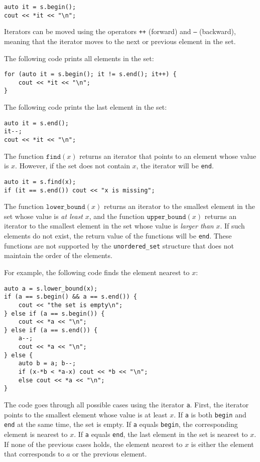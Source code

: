 \begin{lstlisting}
auto it = s.begin();
cout << *it << "\n";
\end{lstlisting}

Iterators can be moved using the operators
\texttt{++} (forward) and \texttt{---} (backward),
meaning that the iterator moves to the next
or previous element in the set.

The following code prints all elements in the set:
\begin{lstlisting}
for (auto it = s.begin(); it != s.end(); it++) {
    cout << *it << "\n";
}
\end{lstlisting}
The following code prints the last element in the set:
\begin{lstlisting}
auto it = s.end();
it--;
cout << *it << "\n";
\end{lstlisting}

The function $\texttt{find}(x)$ returns an iterator
that points to an element whose value is $x$.
However, if the set does not contain $x$,
the iterator will be \texttt{end}.

\begin{lstlisting}
auto it = s.find(x);
if (it == s.end()) cout << "x is missing";
\end{lstlisting}

The function $\texttt{lower\_bound}(x)$ returns
an iterator to the smallest element in the set
whose value is \emph{at least} $x$, and
the function $\texttt{upper\_bound}(x)$
returns an iterator to the smallest element
in the set whose value is \emph{larger than} $x$.
If such elements do not exist,
the return value of the functions will be \texttt{end}.
These functions are not supported by the
\texttt{unordered\_set} structure that
does not maintain the order of the elements.

\begin{samepage}
For example, the following code finds the element
nearest to $x$:

\begin{lstlisting}
auto a = s.lower_bound(x);
if (a == s.begin() && a == s.end()) {
    cout << "the set is empty\n";
} else if (a == s.begin()) {
    cout << *a << "\n";
} else if (a == s.end()) {
    a--;
    cout << *a << "\n";
} else {
    auto b = a; b--;
    if (x-*b < *a-x) cout << *b << "\n";
    else cout << *a << "\n";
}
\end{lstlisting}

The code goes through all possible cases
using the iterator \texttt{a}.
First, the iterator points to the smallest
element whose value is at least $x$.
If \texttt{a} is both \texttt{begin}
and \texttt{end} at the same time, the set is empty.
If \texttt{a} equals \texttt{begin},
the corresponding element is nearest to $x$.
If \texttt{a} equals \texttt{end},
the last element in the set is nearest to $x$.
If none of the previous cases holds,
the element nearest to $x$ is either the
element that corresponds to $a$ or the previous element.
\end{samepage}

